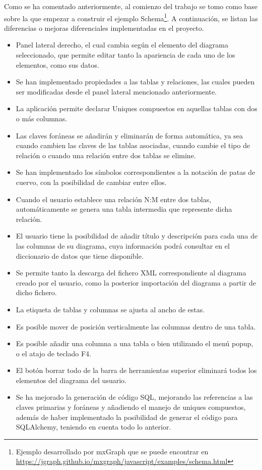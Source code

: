 Como se ha comentado anteriormente, al comienzo del trabajo se tomo como base sobre la que empezar a construir el ejemplo Schema\footnote{Ejemplo desarrollado por mxGraph que se puede encontrar en \url{https://jgraph.github.io/mxgraph/javascript/examples/schema.html}}. A continuación, se listan las diferencias o mejoras diferenciales implementadas en el proyecto.

\begin{itemize}
    \item Panel lateral derecho, el cual cambia según el elemento del diagrama seleccionado, que permite editar tanto la apariencia de cada uno de los elementos, como sus datos.
    \item Se han implementado propiedades a las tablas y relaciones, las cuales pueden ser modificadas desde el panel lateral mencionado anteriormente.
    \item La aplicación permite declarar Uniques compuestos en aquellas tablas con dos o más columnas.
    \item Las claves foráneas se añadirán y eliminarán de forma automática, ya sea cuando cambien las claves de las tablas asociadas, cuando cambie el tipo de relación o cuando una relación entre dos tablas se elimine.
    \item Se han implementado los símbolos correspondientes a la notación de patas de cuervo, con la posibilidad de cambiar entre ellos.
    \item Cuando el usuario establece una relación N:M entre dos tablas, automáticamente se genera una tabla intermedia que represente dicha relación.
    \item El usuario tiene la posibilidad de añadir título y descripción para cada una de las columnas de su diagrama, cuya información podrá consultar en el diccionario de datos que tiene disponible.
    \item Se permite tanto la descarga del fichero XML correspondiente al diagrama creado por el usuario, como la posterior importación del diagrama a partir de dicho fichero.
    \item La etiqueta de tablas y columnas se ajusta al ancho de estas.
    \item Es posible mover de posición verticalmente las columnas dentro de una tabla.
    \item Es posible añadir una columna a una tabla o bien utilizando el menú popup, o el atajo de teclado F4.
    \item El botón borrar todo de la barra de herramientas superior eliminará todos los elementos del diagrama del usuario.
    \item Se ha mejorado la generación de código SQL, mejorando las referencias a las claves primarias y foráneas y añadiendo el manejo de uniques compuestos, además de haber implementado la posibilidad de generar el código para SQLAlchemy, teniendo en cuenta todo lo anterior.
\end{itemize}